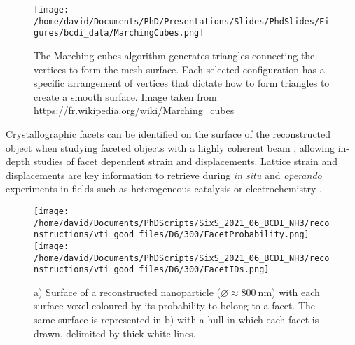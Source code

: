 \begin{figure}[!htb]
    \centering
    \texttt{[image: /home/david/Documents/PhD/Presentations/Slides/PhdSlides/Figures/bcdi\_data/MarchingCubes.png]}
    \caption{
    The Marching-cubes algorithm generates triangles connecting the vertices to form the mesh surface.
    Each selected configuration has a specific arrangement of vertices that dictate how to form triangles to create a smooth surface.
    Image taken from \url{https://fr.wikipedia.org/wiki/Marching_cubes}
    }
    \label{fig:MarchingCubes}
\end{figure}

Crystallographic facets can be identified on the surface of the reconstructed object when studying faceted objects with a highly coherent beam \parencite{Richard2018}, allowing in-depth studies of facet dependent strain and displacements.
Lattice strain and displacements are key information to retrieve during \textit{in situ} and \textit{operando} experiments in fields such as heterogeneous catalysis \parencite{Ulvestad2016, Yau2017a, Kim2018, Fernandez2019, Abuin2019, Kim2019, Kawaguchi2019, Suzana2019, Choi2020, Passos2020,  Kim2021, Carnis2021, Dupraz2022} or electrochemistry \parencite{Ulvestad2015a, Bjorling2019, Vicente2021, Kawaguchi2021, Carnis2021b, Atlan2023}.

\begin{figure}
    \centering
    \texttt{[image: /home/david/Documents/PhDScripts/SixS\_2021\_06\_BCDI\_NH3/reconstructions/vti\_good\_files/D6/300/FacetProbability.png]}
    \texttt{[image: /home/david/Documents/PhDScripts/SixS\_2021\_06\_BCDI\_NH3/reconstructions/vti\_good\_files/D6/300/FacetIDs.png]}
    \caption{
    a) Surface of a reconstructed nanoparticle ($\diameter \approx \qty{800}{\nm}$) with each surface voxel coloured by its probability to belong to a facet.
    The same surface is represented in b) with a hull in which each facet is drawn, delimited by thick white lines.
    }
    \label{fig:FacetsParaview}
\end{figure}

